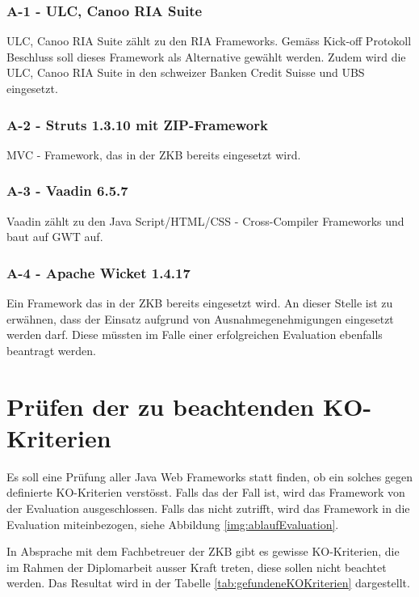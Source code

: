   \subsubsection{A-1 - ULC, Canoo RIA Suite}
  
  ULC, Canoo RIA Suite zählt zu den \ac{RIA} Frameworks. Gemäss Kick-off
  Protokoll Beschluss soll dieses Framework als Alternative gewählt werden.
  Zudem wird die ULC, Canoo RIA Suite in den schweizer Banken Credit Suisse und
  UBS eingesetzt.
  
  \subsubsection{A-2 - Struts 1.3.10 mit ZIP-Framework}
  
  MVC - Framework, das in der ZKB bereits eingesetzt wird.
  
  \subsubsection{A-3 - Vaadin 6.5.7}
  
  Vaadin zählt zu den Java Script/\ac{HTML}/\ac{CSS} - Cross-Compiler Frameworks
  und baut auf \ac{GWT} auf.
  
  \subsubsection{A-4 - Apache Wicket 1.4.17}
  
  Ein Framework das in der ZKB bereits eingesetzt wird. An dieser Stelle ist zu
  erwähnen, dass der Einsatz aufgrund von Ausnahmegenehmigungen eingesetzt
  werden darf. Diese müssten im Falle einer erfolgreichen Evaluation ebenfalls
  beantragt werden.
  
  \section{Prüfen der zu beachtenden KO-Kriterien}
  
  Es soll eine Prüfung aller Java Web Frameworks statt finden, ob ein solches
  gegen definierte KO-Kriterien verstösst. Falls das der Fall ist, wird das
  Framework von der Evaluation ausgeschlossen. Falls das nicht zutrifft, wird
  das Framework in die Evaluation miteinbezogen, siehe Abbildung
  \ref{img:ablaufEvaluation}.
  
  In Absprache mit dem Fachbetreuer der \ac{ZKB} gibt es gewisse KO-Kriterien,
  die im Rahmen der Diplomarbeit ausser Kraft treten, diese sollen nicht
  beachtet werden. Das Resultat wird in der Tabelle
  \ref{tab:gefundeneKOKriterien} dargestellt.
  \newline
  

